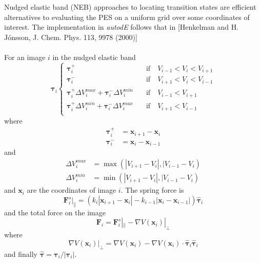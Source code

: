 \documentclass[10pt]{article}
\begin{document}
Nudged elastic band (NEB) approaches to locating transition states are efficient alternatives to evaluating the PES on a uniform grid over some coordinates of interest. The implementation in \emph{autodE} follows that in [Henkelman and H. Jónsson, J. Chem. Phys. 113, 9978 (2000)]
\\\\
For an image $i$ in the nudged elastic band
\begin{equation}
\boldsymbol{\tau}_i
\begin{cases}
\boldsymbol{\tau}_i^+ &\quad\text{if}\quad V_{i-1} < V_i < V_{i+1} \\
\boldsymbol{\tau}_i^- &\quad\text{if}\quad V_{i+1} < V_i < V_{i-1} \\
\boldsymbol{\tau}_i^+\Delta V_i^{max} + \boldsymbol{\tau}_i^-\Delta V_i^{min} &\quad\text{if}\quad V_{i-1} <  V_{i+1} \\
\boldsymbol{\tau}_i^+\Delta V_i^{min} + \boldsymbol{\tau}_i^-\Delta V_i^{max} &\quad\text{if}\quad V_{i+1} < V_{i-1} \\
\end{cases}
\end{equation}
where
\begin{equation}
\begin{aligned}
\boldsymbol{\tau}_i^+ &= \boldsymbol{x}_{i+1} - \boldsymbol{x}_i \\
\boldsymbol{\tau}_i^- &= \boldsymbol{x}_{i} - \boldsymbol{x}_{i-1}
\end{aligned}
\end{equation}
and
\begin{equation}
\begin{aligned}
\Delta V_i^{max} &= \max(|V_{i+1} - V_i|, |V_{i-1} - V_i) \\
\Delta V_i^{min} &= \min(|V_{i+1} - V_i|, |V_{i-1} - V_i)
\end{aligned}
\end{equation}
and $\boldsymbol{x}_i$ are the coordinates of image $i$. The spring force is
\begin{equation}
\boldsymbol{F}^s_i|_{\parallel} = (k_i|\boldsymbol{x}_{i+1} - \boldsymbol{x}_i| - k_{i-1}|\boldsymbol{x}_i - \boldsymbol{x}_{i-1}|) \hat{\boldsymbol{\tau}}_i
\end{equation}
and the total force on the image
\begin{equation}
\boldsymbol{F}_i = \boldsymbol{F}^s_i|_{\parallel} - \nabla V(\boldsymbol{x}_i)|_\perp
\end{equation}
where
\begin{equation}
\nabla V(\boldsymbol{x}_i)|_\perp = \nabla V(\boldsymbol{x}_i) - \nabla V(\boldsymbol{x}_i)\cdot \hat{\boldsymbol{\tau}}_i\hat{\boldsymbol{\tau}}_i
\end{equation}
and finally $\hat{\boldsymbol{\tau}} = \boldsymbol{\tau}_i/|\boldsymbol{\tau}_i|$.
\end{document}
